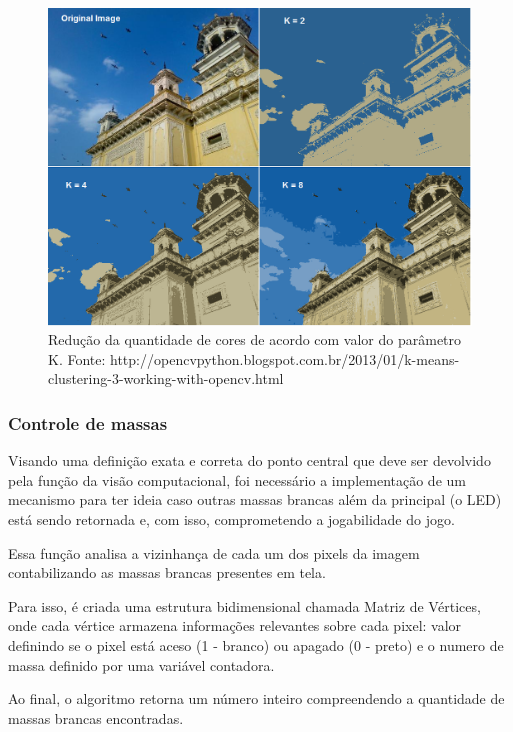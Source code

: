 \documentclass[12pt]{article}
\begin{document}
	\begin{figure}[ht!]
	\begin{center}
		\includegraphics[scale=0.3]{img/kmeansout.png}
		\footnotesize \caption{Redu\c c\~ao da quantidade de cores de acordo com valor do par\^ametro K. Fonte: http://opencvpython.blogspot.com.br/2013/01/k-means-clustering-3-working-with-opencv.html }
	\end{center}
	\end{figure}	

\subsubsection{Controle de massas}
Visando uma defini\c c\~ao exata e correta do ponto central que deve ser devolvido pela fun\c c\~ao da vis\~ao computacional,
foi necess\'ario a implementa\c c\~ao de um mecanismo para ter ideia caso outras massas brancas al\'em da principal (o LED)
est\'a sendo retornada e, com isso, comprometendo a jogabilidade do jogo.

Essa fun\c c\~ao analisa a vizinhan\c ca de cada um dos pixels da imagem contabilizando as massas brancas presentes em tela.

Para isso, \'e criada uma estrutura bidimensional chamada Matriz de V\'ertices, onde cada v\'ertice armazena informa\c c\~oes
relevantes sobre cada pixel: valor definindo se o pixel está aceso (1 - branco) ou apagado (0 - preto) e o numero de massa
definido por uma vari\'avel contadora.

Ao final, o algoritmo retorna um n\'umero inteiro compreendendo a quantidade de massas brancas encontradas.
\end{document}
